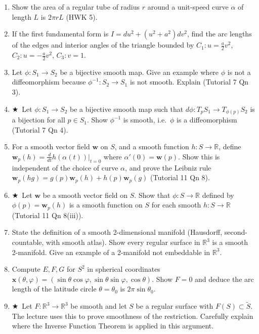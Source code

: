 \documentclass[11pt, a4paper]{article}
\newcommand{\R}{\mathbb{R}}
\newcommand{\hard}{$\bigstar$\ }
\begin{document}
\begin{enumerate}[label=\textbf{Q\arabic*.}, leftmargin=*, itemsep=6pt]
\item Show the area of a regular tube of radius $r$ around a unit-speed curve $\alpha$ of length $L$ is $2\pi r L$ (HWK 5).

\item If the first fundamental form is $I=du^2+(u^2+a^2)dv^2$, find the arc lengths of the edges and interior angles of the triangle bounded by $C_1:u=\tfrac{a}{2}v^2$, $C_2:u=-\tfrac{a}{2}v^2$, $C_3:v=1$.

\item Let $\phi:S_1\to S_2$ be a bijective smooth map. Give an example where $\phi$ is not a diffeomorphism because $\phi^{-1}:S_2\to S_1$ is not smooth. Explain (Tutorial 7 Qn 3).

\item \hard Let $\phi:S_1\to S_2$ be a bijective smooth map such that $d\phi:T_pS_1\to T_{\phi(p)}S_2$ is a bijection for all $p\in S_1$. Show $\phi^{-1}$ is smooth, i.e.\ $\phi$ is a diffeomorphism (Tutorial 7 Qn 4).

\item For a smooth vector field $\mathbf{w}$ on $S$, and a smooth function $h:S\to\R$, define $\mathbf{w}_p(h)=\frac{d}{dt}h(\alpha(t))|_{t=0}$ where $\alpha'(0)=\mathbf{w}(p)$. Show this is independent of the choice of curve $\alpha$, and prove the Leibniz rule $\mathbf{w}_p(hg)=g(p)\mathbf{w}_p(h)+h(p)\mathbf{w}_p(g)$ (Tutorial 11 Qn 8).

\item \hard Let $\mathbf{w}$ be a smooth vector field on $S$. Show that $\phi:S\to\R$ defined by $\phi(p)=\mathbf{w}_p(h)$ is a smooth function on $S$ for each smooth $h:S\to\R$ (Tutorial 11 Qn 8(iii)).

\item State the definition of a smooth 2-dimensional manifold (Hausdorff, second-countable, with smooth atlas). Show every regular surface in $\R^3$ is a smooth 2-manifold. Give an example of a 2-manifold not embeddable in $\R^3$.

\item Compute $E,F,G$ for $S^2$ in spherical coordinates $\mathbf{x}(\theta,\varphi)=(\sin\theta\cos\varphi,\sin\theta\sin\varphi,\cos\theta)$. Show $F=0$ and deduce the arc length of the latitude circle $\theta=\theta_0$ is $2\pi\sin\theta_0$.

\item \hard Let $F:\R^3\to\R^3$ be smooth and let $S$ be a regular surface with $F(S)\subset\tilde S$. The lecture uses this to prove smoothness of the restriction. Carefully explain where the Inverse Function Theorem is applied in this argument.


\end{enumerate}
\end{document}
